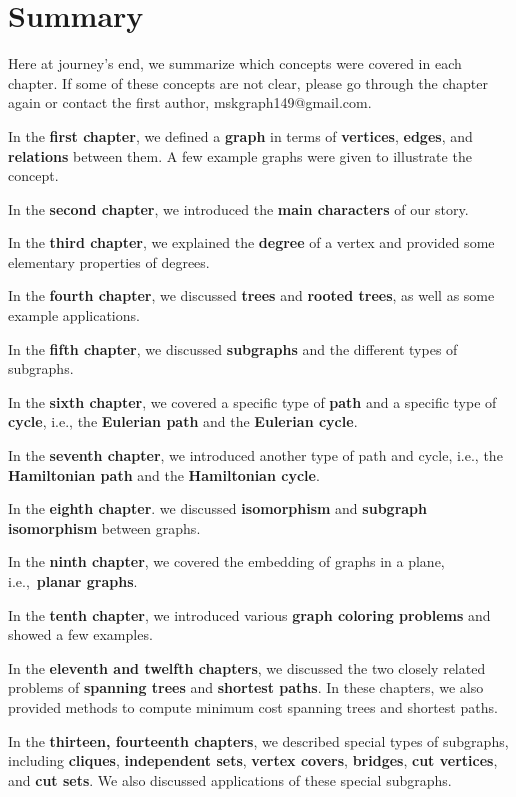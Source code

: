 \chapter{Summary}
Here at journey's end, we summarize which concepts were covered in each chapter. If some of these concepts are not clear, please go through the chapter again or contact the first author, mskgraph149@gmail.com.

In the \textbf{first chapter}, we defined a \textbf{graph} in terms of \textbf{vertices}, \textbf{edges}, and \textbf{relations} between them. A few example graphs were given to illustrate the concept.

In the \textbf{second chapter}, we introduced the \textbf{main characters} of our story.

In the \textbf{third chapter}, we explained the \textbf{degree} of a vertex and provided some elementary properties of degrees.

In the \textbf{fourth chapter}, we discussed \textbf{trees} and \textbf{rooted trees}, as well as some example applications.

In the \textbf{fifth chapter}, we discussed \textbf{subgraphs} and the different types of subgraphs.

In the \textbf{sixth chapter}, we covered a specific type of \textbf{path} and a specific type of \textbf{cycle}, i.e., the \textbf{Eulerian path} and the \textbf{Eulerian cycle}.

In the \textbf{seventh chapter}, we introduced another type of path and cycle, i.e., the \textbf{Hamiltonian path} and the \textbf{Hamiltonian cycle}.

In the \textbf{eighth chapter}. we discussed \textbf{isomorphism} and \textbf{subgraph isomorphism} between graphs.

In the \textbf{ninth chapter}, we covered the embedding of graphs in a plane, i.e.,~\textbf{planar graphs}.

In the \textbf{tenth chapter}, we introduced various \textbf{graph coloring problems} and showed a few examples.

In the \textbf{eleventh and twelfth chapters}, we discussed the two closely related problems of \textbf{spanning trees} and \textbf{shortest paths}.
In these chapters, we also provided methods to compute minimum cost spanning trees and shortest paths.

In the \textbf{thirteen, fourteenth chapters}, we described special types of subgraphs, including \textbf{cliques}, \textbf{independent sets}, \textbf{vertex covers}, \textbf{bridges}, \textbf{cut vertices}, and \textbf{cut sets}.
We also discussed applications of these special subgraphs.

